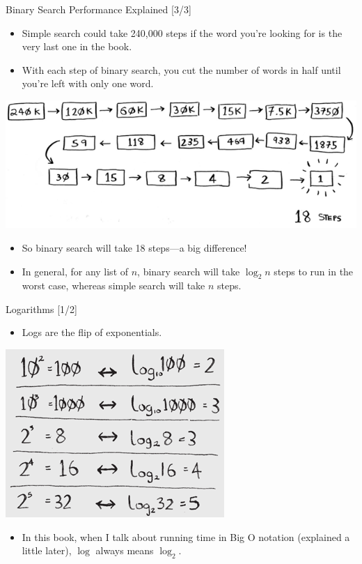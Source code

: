 \documentclass[ignorenonframetext,]{beamer}
\providecommand{\tightlist}{%
  \setlength{\itemsep}{0pt}\setlength{\parskip}{0pt}}
\begin{document}
\begin{frame}{Binary Search Performance Explained {[}3/3{]}}
\protect\hypertarget{binary-search-performance-explained-33}{}

\begin{itemize}
\tightlist
\item
  Simple search could take 240,000 steps if the word you're looking for
  is the very last one in the book.
\item
  With each step of binary search, you cut the number of words in half
  until you're left with only one word.
\end{itemize}

\includegraphics{./Chapter01-figure/search_steps_03.png}

\begin{itemize}
\tightlist
\item
  So binary search will take 18 steps---a big difference!
\item
  In general, for any list of \(n\), binary search will take
  \(\log_2 n\) steps to run in the worst case, whereas simple search
  will take \(n\) steps.
\end{itemize}

\end{frame}

\begin{frame}{Logarithms {[}1/2{]}}
\protect\hypertarget{logarithms-12}{}

\begin{itemize}
\tightlist
\item
  Logs are the flip of exponentials.
\end{itemize}

\includegraphics{./Chapter01-figure/logarithms.png}

\begin{itemize}
\tightlist
\item
  In this book, when I talk about running time in Big O notation
  (explained a little later), \(\log\) always means \(\log_2\).
\end{itemize}

\end{frame}
\end{document}
